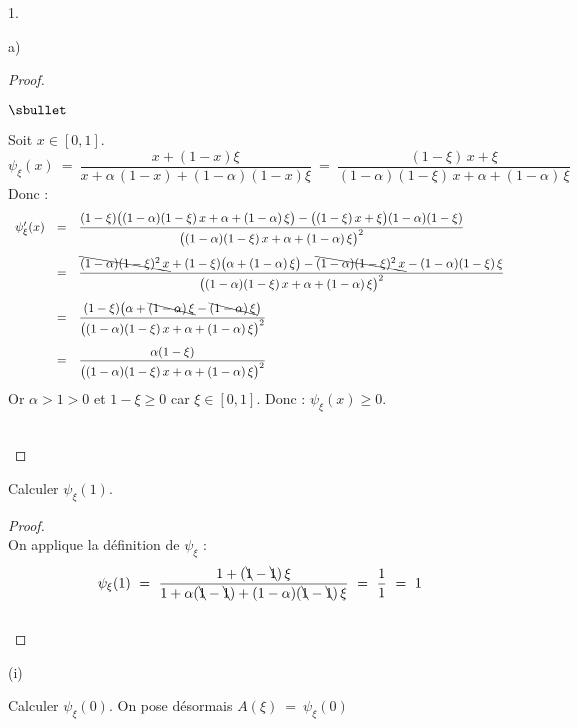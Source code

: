 \documentclass[11pt]{article}%
\begin{document}
\begin{noliste}{1.}
\begin{noliste}{a)}
\begin{proof}
\begin{noliste}{$\sbullet$}
	

	
	\item Soit $x \in [0,1]$.
	\[
	  \psi_\xi(x) \ = \ 
	  \dfrac{x+ (1-x) \xi}{x + \alpha \, (1-x) + 
	  (1- \alpha)(1-x)\xi}
	  \ = \
	  \dfrac{(1-\xi) \, x + \xi}
	  {(1-\alpha)(1-\xi) \, x + \alpha + (1-\alpha) \, \xi}
	\]
	Donc :
	\[
	  \begin{array}{rcl}
	    \psi_\xi'(x) &=& 
	    \dfrac{(1-\xi)\big((1-\alpha)(1-\xi) \, x + \alpha 
	    + (1-\alpha) \, \xi\big) - \big((1-\xi) \, x + \xi\big)
	    (1-\alpha)(1-\xi)}
	    {\big((1-\alpha)(1-\xi) \, x + \alpha + (1-\alpha) \,
	    \xi\big)^2}
	    \\[.6cm]
	    &=& \dfrac{\bcancel{(1-\alpha)(1-\xi)^2 \, x} + 
	    (1-\xi)\big(\alpha + (1-\alpha) \, \xi\big) - 
	    \bcancel{(1-\alpha)(1-\xi)^2 \, x} - (1-\alpha)(1-\xi)
	    \, \xi}
	    {\big((1-\alpha)(1-\xi) \, x + \alpha + (1-\alpha) \,
	    \xi\big)^2}
	    \\[.6cm]
	    &=& \dfrac{(1-\xi)\big(\alpha + \bcancel{(1-\alpha) \, \xi}
	    - \bcancel{(1-\alpha) \, \xi}\big)}
	    {\big((1-\alpha)(1-\xi) \, x + \alpha + (1-\alpha) \,
	    \xi\big)^2}
	    \\[.6cm]
	    &=& \dfrac{\alpha (1-\xi)}
	    {\big((1-\alpha)(1-\xi) \, x + \alpha + (1-\alpha) \,
	    \xi\big)^2}
	  \end{array}
	\]
	Or $\alpha >1>0$ et $1-\xi \geq 0$ car $\xi \in [0,1]$. Donc :
	$\psi_\xi(x) \geq 0$.
      \end{noliste}
      
      ~\\[-1.4cm]
    \end{proof}

    
    \item Calculer $\psi_\xi(1)$.
    
    \begin{proof}~\\
      On applique la définition de $\psi_\xi$ :
      \[
        \psi_\xi(1) \ = \ \dfrac{1+(\bcancel{1} - \bcancel{1}) \, \xi}
        {1+ \alpha(\bcancel{1}-\bcancel{1}) + (1-\alpha)
        (\bcancel{1}-\bcancel{1}) \, \xi} \ = \ \dfrac{1}{1} \ = \ 1
      \]
      \conc{$\psi_\xi(1) = 1$}~\\[-1cm]
    \end{proof}

    
    \item 
    \begin{nonoliste}{(i)}
      \item Calculer $\psi_\xi(0)$. On pose désormais
      $
        A(\xi) \ = \ \psi_\xi(0)
      $
      

\end{nonoliste}
\end{noliste}
\end{noliste}
\end{document}
